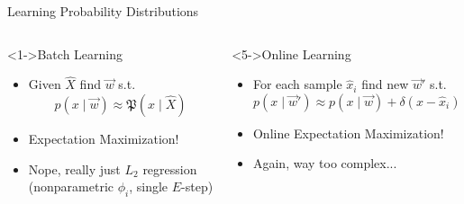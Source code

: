 \documentclass[aspectratio=169]{beamer}
\begin{document}
\begin{frame}{Learning Probability Distributions}
	\begin{columns}[t]
		\begin{block}<1->{Batch Learning}
			\begin{itemize}
				\setlength{\itemsep}{1em}
				\item<2-> Given $\hat X$ find $\vec w$ s.t.
					$$p(x \mid \vec w) \approx \mathfrak{P}(x \mid \hat X)$$
				\item<3-> Expectation Maximization!
				\item<4-> Nope, really just $L_2$ regression\\(nonparametric $\phi_i$, single $E$-step)
			\end{itemize}
		\end{block}
		\begin{block}<5->{Online Learning}
			\begin{itemize}
				\setlength{\itemsep}{1em}
				\item<5-> For each sample $\hat x_i$ find new $\vec w'$ s.t.
					$$p(x \mid \vec w') \approx p(x \mid \vec w) + \delta(x - \hat x_i)$$
				\item<6-> Online Expectation Maximization!
				\item<7-> Again, way too complex...
			\end{itemize}
		\end{block}
	\end{columns}
\end{frame}
\end{document}
